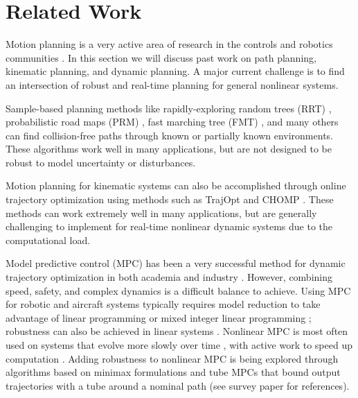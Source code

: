 \section{Related Work \label{sec:relatedwork}}
Motion planning is a very active area of research in the controls and robotics communities \cite{Hoy2015}.  In this section we will discuss past work on path planning, kinematic planning, and dynamic planning.  A major current challenge is to find an intersection of robust and real-time planning for general nonlinear systems. 

Sample-based planning methods like rapidly-exploring random trees (RRT) \cite{Kuffner2000}, probabilistic road maps (PRM) \cite{Kavraki1996}, fast marching tree (FMT) \cite{Janson2015}, and many others \cite{Richter2016, Karaman2011, Kobilarov2012} can find collision-free paths through known or partially known environments. These algorithms work well in many applications, but are not designed to be robust to model uncertainty or disturbances.

Motion planning for kinematic systems can also be accomplished through online trajectory optimization using methods such as TrajOpt \cite{Schulman2013} and CHOMP \cite{Ratliff2009}. These methods can work extremely well in many applications, but are generally challenging to implement for real-time nonlinear dynamic systems due to the computational load.

Model predictive control (MPC) has been a very successful method for dynamic trajectory optimization in both academia and industry \cite{Qin2003}.  However, combining speed, safety, and complex dynamics is a difficult balance to achieve. Using MPC for robotic and aircraft systems typically requires model reduction to take advantage of linear programming or mixed integer linear programming \cite{Vitus2008, Zeilinger2011, Richter2012}; robustness can also be achieved in linear systems \cite{Richards2006, DiCairano2016}. Nonlinear MPC is most often used on systems that evolve more slowly over time \cite{Diehl2002, Schildbach2016}, with active work to speed up computation \cite{Diehl2009, Neunert2016}. Adding robustness to nonlinear MPC is being explored through algorithms based on minimax formulations and tube MPCs that bound output trajectories with a tube around a nominal path (see survey paper \cite{Hoy2015} for references).


